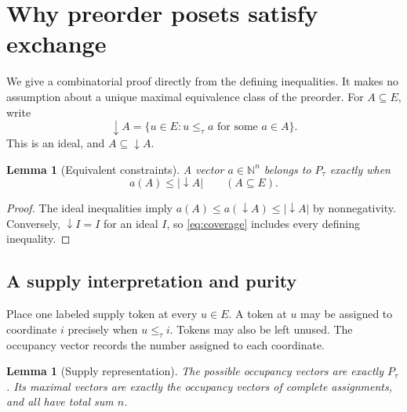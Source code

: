 \documentclass[11pt]{article}
\numberwithin{equation}{section}
\newtheorem{lemma}[theorem]{Lemma}
\theoremstyle{definition}
\theoremstyle{remark}
\newcommand{\N}{\mathbb N}
\begin{document}
\section{Why preorder posets satisfy exchange}
\label{sec:assignments}

We give a combinatorial proof directly from the defining inequalities. It
makes no assumption about a unique maximal equivalence class of the preorder.
For $A\subseteq E$, write
\[
 \downarrow A=\{u\in E:u\le_\tau a\text{ for some }a\in A\}.
\]
This is an ideal, and $A\subseteq\downarrow A$.

\begin{lemma}[Equivalent constraints]
\label{lem:coverage-constraints}
A vector $a\in\N^n$ belongs to $P_\tau$ exactly when
\begin{equation}
 a(A)\le |\downarrow A|\qquad(A\subseteq E).
 \label{eq:coverage}
\end{equation}
\end{lemma}

\begin{proof}
The ideal inequalities imply
$a(A)\le a(\downarrow A)\le|\downarrow A|$ by nonnegativity. Conversely,
$\downarrow I=I$ for an ideal $I$, so \eqref{eq:coverage} includes every
defining inequality.
\end{proof}

\subsection{A supply interpretation and purity}

Place one labeled supply token at every $u\in E$. A token at $u$ may be
assigned to coordinate $i$ precisely when $u\le_\tau i$. Tokens may also be
left unused. The occupancy vector records the number assigned to each
coordinate.

\begin{lemma}[Supply representation]
\label{lem:supply}
The possible occupancy vectors are exactly $P_\tau$. Its maximal vectors are
exactly the occupancy vectors of complete assignments, and all have total
sum $n$.
\end{lemma}
\end{document}
